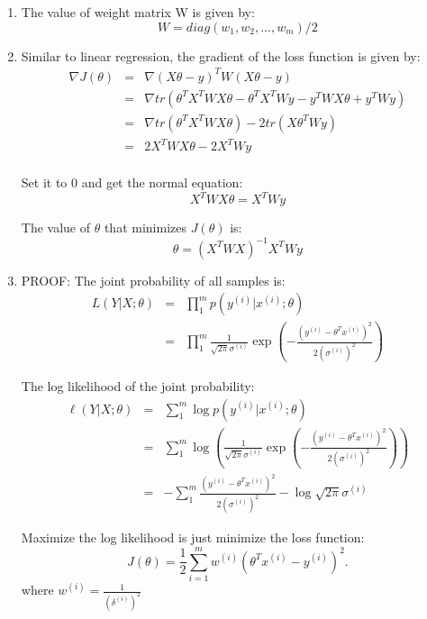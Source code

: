 \begin{answer}


\begin{enumerate}

\item The value of weight matrix W is given by:
\begin{equation*}
W = diag(w_1,w_2,...,w_m)/2
\end{equation*}

\item Similar to linear regression, the gradient of the loss function is given by:
\begin{eqnarray*}
\nabla J(\theta) 
    &=& \nabla (X\theta - {y})^T W (X\theta - {y}) \\
    &=& \nabla tr(\theta^T X^T W X\theta - \theta^T X^T W y - y^T W X\theta + y^T W y) \\
    &=& \nabla tr(\theta^T X^T W X\theta) - 2tr(X\theta^T W y) \\
    &=& 2 X^T W X\theta - 2 X^T W y \\
\end{eqnarray*}

Set it to 0 and get the normal equation:
\begin{equation*}
    X^T W X\theta = X^T W y 
\end{equation*}

The value of $\theta$ that minimizes $J(\theta)$ is:
\begin{equation*}
    \theta = (X^T W X)^{-1} X^T W y 
\end{equation*}


\item PROOF:
The joint probability of all samples is:
\begin{eqnarray*}
L(Y|X;\theta) 
    &=& \prod_1^m p(y^{(i)} | x^{(i)} ; \theta) \\
    &=& \prod_1^m \frac{1}{\sqrt{2\pi}\sigma^{(i)}} \exp\left(-
    \frac{(y^{(i)} - \theta^Tx^{(i)})^2}{2(\sigma^{(i)})^2}\right)
\end{eqnarray*}

The log likelihood of the joint probability:
\begin{eqnarray*}
\ell(Y|X;\theta) 
    &=& \sum_1^m \log p(y^{(i)} | x^{(i)} ; \theta) \\
    &=& \sum_1^m \log \left(\frac{1}{\sqrt{2\pi}\sigma^{(i)}} \exp\left(-
    \frac{(y^{(i)} - \theta^Tx^{(i)})^2}{2(\sigma^{(i)})^2}\right) \right) \\
    &=& -\sum_1^m \frac{(y^{(i)} - \theta^Tx^{(i)})^2}{2(\sigma^{(i)})^2} - \log \sqrt{2\pi}\sigma^{(i)}
\end{eqnarray*}

Maximize the log likelihood is just minimize the loss function:
\begin{equation*}
	J(\theta) = \frac{1}{2} \sum_{i=1}^m w^{(i)}
		\left(\theta^Tx^{(i)} - y^{(i)}\right)^2.
\end{equation*}
where $w^{(i)} = \frac{1}{(\delta^{(i)})^2}$

\end{enumerate}
\end{answer}
